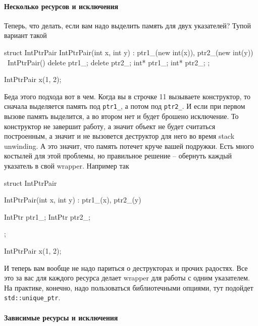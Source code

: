 \paragraph{Несколько ресурсов и исключения}

Теперь, что делать, если вам надо выделить память для двух указателей?
Тупой вариант такой
\begin{cppcode}
struct IntPtrPair {
  IntPtrPair(int x, int y) : ptr1_(new int(x)), ptr2_(new int(y)) {}
  ~IntPtrPair() {
    delete ptr1_;
    delete ptr2_;
  }
  int* ptr1_;
  int* ptr2_;
};

IntPtrPair x(1, 2);
\end{cppcode}
Беда этого подхода вот в чем.
Когда вы в строчке 11 вызываете конструктор, то сначала выделяется память под \verb"ptr1_", а потом под \verb"ptr2_".
И если при первом вызове память выделится, а во втором нет и будет брошено исключение.
То конструктор не завершит работу, а значит объект не будет считаться построенным, а значит и не вызовется деструктор для него во время stack unwinding.
А это значит, что память потечет круче вашей подружки.
Есть много костылей для этой проблемы, но правильное решение -- обернуть каждый указатель в свой wrapper.
Например так
\begin{cppcode}
struct IntPtrPair {
  IntPtrPair(int x, int y) : ptr1_(x), ptr2_(y) {}

  IntPtr ptr1_;
  IntPtr ptr2_;
};

IntPtrPair x(1, 2);
\end{cppcode}
И теперь вам вообще не надо париться о деструкторах и прочих радостях.
Все это за вас для каждого ресурса делает wrapper для работы с одним указателем.
На практике, конечно, надо пользоваться библиотечными опциями, тут подойдет \verb"std::unique_ptr".

\paragraph{Зависимые ресурсы и исключения}

